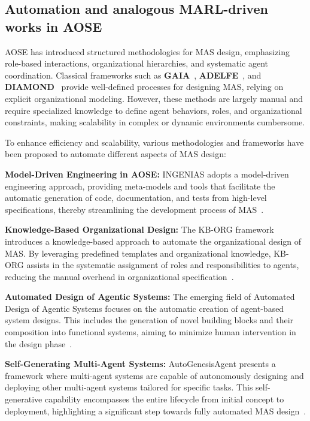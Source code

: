 \documentclass[pdflatex,sn-mathphys-num]{sn-jnl}%
\theoremstyle{thmstyleone}%
\theoremstyle{thmstyletwo}%
\theoremstyle{thmstylethree}%
\begin{document}
\subsection{Automation and analogous MARL-driven works in AOSE}\label{sub-sec:rel_aose_automate_marl}

AOSE has introduced structured methodologies for MAS design, emphasizing role-based interactions, organizational hierarchies, and systematic agent coordination. Classical frameworks such as \textbf{GAIA}~\cite{gaia1998}, \textbf{ADELFE}~\cite{adelfe2002}, and \textbf{DIAMOND}~\cite{Jamont2005} provide well-defined processes for designing MAS, relying on explicit organizational modeling. However, these methods are largely manual and require specialized knowledge to define agent behaviors, roles, and organizational constraints, making scalability in complex or dynamic environments cumbersome.

To enhance efficiency and scalability, various methodologies and frameworks have been proposed to automate different aspects of MAS design:

\textbf{Model-Driven Engineering in AOSE:} INGENIAS adopts a model-driven engineering approach, providing meta-models and tools that facilitate the automatic generation of code, documentation, and tests from high-level specifications, thereby streamlining the development process of MAS~\cite{pavon2005agent}.

\textbf{Knowledge-Based Organizational Design:} The KB-ORG framework introduces a knowledge-based approach to automate the organizational design of MAS. By leveraging predefined templates and organizational knowledge, KB-ORG assists in the systematic assignment of roles and responsibilities to agents, reducing the manual overhead in organizational specification~\cite{dignum2001kb}.

\textbf{Automated Design of Agentic Systems:} The emerging field of Automated Design of Agentic Systems focuses on the automatic creation of agent-based system designs. This includes the generation of novel building blocks and their composition into functional systems, aiming to minimize human intervention in the design phase~\cite{smith2024automated}.

\textbf{Self-Generating Multi-Agent Systems:} AutoGenesisAgent presents a framework where multi-agent systems are capable of autonomously designing and deploying other multi-agent systems tailored for specific tasks. This self-generative capability encompasses the entire lifecycle from initial concept to deployment, highlighting a significant step towards fully automated MAS design~\cite{harper2024autogenesisagent}.
\end{document}
